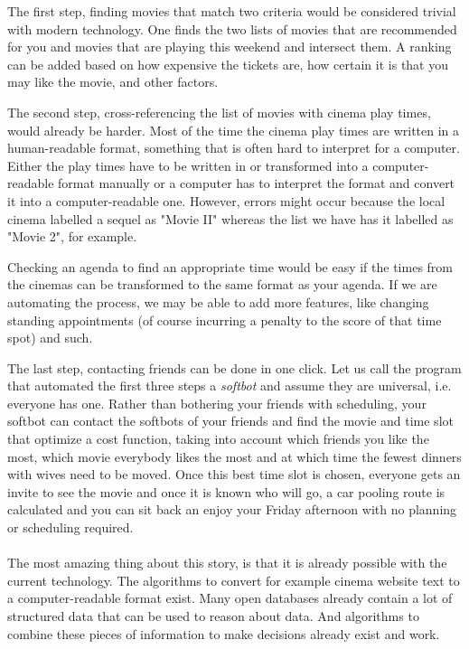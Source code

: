 \documentclass{article}
\begin{document}
The first step, finding movies that match two criteria would be considered trivial with modern technology. One finds the two lists of movies that are recommended for you and movies that are playing this weekend and intersect them. A ranking can be added based on how expensive the tickets are, how certain it is that you may like the movie, and other factors. 

 The second step, cross-referencing the list of movies with cinema play times, would already be harder. Most of the time the cinema play times are written in a human-readable format, something that is often hard to interpret for a computer. Either the play times have to be written in or transformed into a computer-readable format manually or a computer has to interpret the format and convert it into a computer-readable one. However, errors might occur because the local cinema labelled a sequel as "Movie II" whereas the list we have has it labelled as "Movie 2", for example.
 
 Checking an agenda to find an appropriate time would be easy if the times from the cinemas can be transformed to the same format as your agenda. If we are automating the process, we may be able to add more features, like changing standing appointments (of course incurring a penalty to the score of that time spot) and such.
 
 The last step, contacting friends can be done in one click. Let us call the program that automated the first three steps a \emph{softbot} and assume they are universal, i.e. everyone has one. Rather than bothering your friends with scheduling, your softbot can contact the softbots of your friends and find the movie and time slot that optimize a cost function, taking into account which friends you like the most, which movie everybody likes the most and at which time the fewest dinners with wives need to be moved. Once this best time slot is chosen, everyone gets an invite to see the movie and once it is known who will go, a car pooling route is calculated and you can sit back an enjoy your Friday afternoon with no planning or scheduling required.
 \paragraph{}
 The most amazing thing about this story, is that it is already possible with the current technology. The algorithms to convert for example cinema website text to a computer-readable format exist. Many open databases already contain a lot of structured data that can be used to reason about data. And algorithms to combine these pieces of information to make decisions already exist and work.
\end{document}
